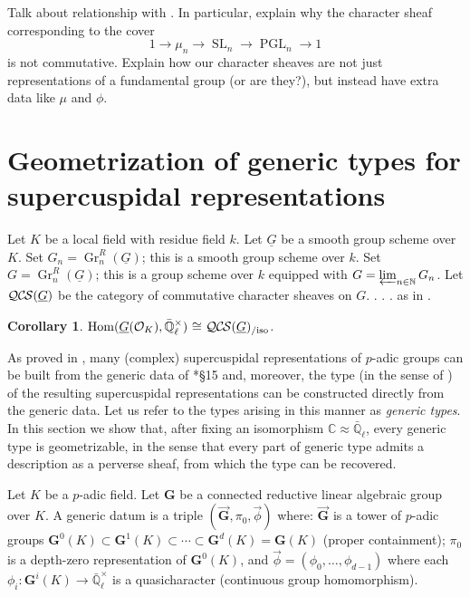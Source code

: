 \documentclass[10pt]{amsart}
\theoremstyle{plain}
\newtheorem{corollary}[theorem]{Corollary}
\theoremstyle{definition}
\newcommand{\NN}{{\mathbb{N}}}
\newcommand{\CC}{{\mathbb{C}}}
\newcommand{\EE}{\mathbb{\bar Q}_\ell}
\newcommand{\OK}{\mathcal{O}_K}
\newcommand{\Fq}{k}
\newcommand{\EEx}{\EE^\times}
\newcommand{\G}{\textbf{G}}
\DeclareMathOperator{\Hom}{Hom}
\DeclareMathOperator{\Gr}{Gr}
\DeclareMathOperator{\SL}{SL}
\DeclareMathOperator{\PGL}{PGL}
\newcommand{\iso}{{\ \cong\ }}
\newcommand{\QCS}{{\mathcal{QC\hskip-0.8pt S}}}
\newcommand{\QCSiso}[1]{\QCS(#1)_{/\text{iso}}}
\begin{document}
 Talk about relationship with \cite{kamgarpour:09a}.  In particular, explain why the character sheaf corresponding
 to the cover
 \[
 1 \to \mu_n \to \SL_n \to \PGL_n \to 1
 \]
 is not commutative.  Explain how our character sheaves are not just representations of a fundamental group
 (or are they?), but instead have extra data like $\mu$ and $\phi$.

\section{Geometrization of generic types for supercuspidal representations}


Let $K$ be a local field with residue field $\Fq$.
Let $\underline{G}$ be a smooth group scheme over $K$.
Set $G_n = \Gr^R_n(\underline{G})$; this is a smooth group scheme over $\Fq$.
Set $G = \Gr^R_n(\underline{G})$; this is a group scheme over $\Fq$ equipped with $G = \varprojlim_{n\in \NN} G_n$.
Let $\QCS(\underline{G})$ be the category of commutative character sheaves on $G$. . . .  as in \cite{cunningham-roe:13a}.

\begin{corollary}\label{cor:QCS}
$\Hom(\underline{G}(\OK),\EEx) \iso \QCSiso{\underline{G}}$.
\end{corollary}

 


As proved in \cite{kim:07a}, many (complex) supercuspidal representations of $p$-adic groups can be built from the generic data of \cite{yu:01a}*{\S 15} and, moreover, the type (in the sense of \cite{bushnell-kutzko:98a}) of the resulting supercuspidal representations can be constructed directly from the generic data. 
Let us refer to the types arising in this manner as {\it generic types}.
In this section we show that, after fixing an isomorphism $\CC \approx \EE$, every generic type is geometrizable, in the sense that every part of generic type admits a description as a perverse sheaf, from which the type can be recovered.

Let $K$ be a $p$-adic field. Let $\G$ be a connected reductive linear algebraic group over $K$. 
A generic datum is a triple $(\vec{\G}, \pi_0, \vec{\phi})$ where: $\vec{\G}$ is a tower of $p$-adic groups $\G^0(K) \subset \G^1(K) \subset \cdots  \subset \G^d(K) = \G(K)$ (proper containment); $\pi_0$ is a depth-zero representation of $\G^0(K)$, and $\vec{\phi} = (\phi_0, \ldots , \phi_{d-1})$ where each $\phi_i : \G^i(K) \to \EEx$ is a quasicharacter (continuous group homomorphism).  
\end{document}
